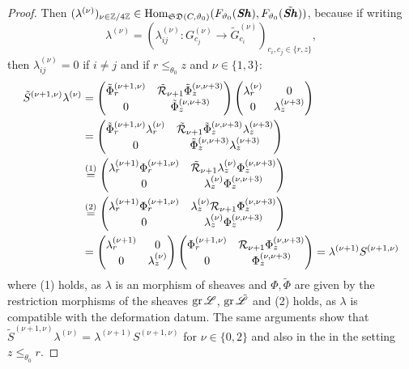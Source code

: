 \begin{proof}
    Then $(\lambda^{(\nu)})_{\nu \in \mathbb{Z}/4\mathbb{Z}} \in \operatorname{Hom}_{\mathfrak{SD}(C,\vartheta_0)}(F_{\vartheta_0}(\bm{\mathit{Sh}}),F_{\vartheta_0}(\tilde{\bm{\mathit{Sh}}}))$, because if writing \[\lambda^{(\nu)} = (\lambda_{ij}^{(\nu)}: G_{c_j}^{(\nu)} \to \tilde{G}_{c_i}^{(\nu)})_{c_i,c_j \in \{r,z\}},\] then $\lambda_{ij}^{(\nu)} = 0$ if $i\neq j$ and if $r \leq_{\theta_0} z$ and $\nu \in \{1,3\}$: 
        \begin{align*}
\tilde{S}^{(\nu+1,\nu)} \lambda^{(\nu)} & = 
        \begin{pmatrix}
            \tilde{\Phi}^{(\nu+1,\nu)}_r & \tilde{\mathcal{R}}_{\nu+1}\tilde{\Phi}_z^{(\nu,\nu+3)}\\
            0 & \tilde{\Phi}_z^{(\nu,\nu+3)}
        \end{pmatrix} 
        \begin{pmatrix}
            \lambda_r^{(\nu)} & 0\\
            0 & \lambda_z^{(\nu+3)}
        \end{pmatrix}
        \\ & =
        \begin{pmatrix}
            \tilde{\Phi}^{(\nu+1,\nu)}_r \lambda_r^{(\nu)} & \tilde{\mathcal{R}}_{\nu+1 }\tilde{\Phi}_z^{(\nu,\nu+3)} \lambda_z^{(\nu+3)}\\
            0 & \tilde{\Phi}_z^{(\nu,\nu+3)}\lambda_z^{(\nu+3)}
        \end{pmatrix} 
        \\ & \overset{(1)}{=} \begin{pmatrix}
            \lambda_r^{(\nu+1)}\Phi^{(\nu+1,\nu)}_r & \tilde{\mathcal{R}}_{\nu+1}\lambda_z^{(\nu)}\Phi_z^{(\nu,\nu+3)}\\
            0 & \lambda_z^{(\nu)}\Phi_z^{(\nu,\nu+3)}
        \end{pmatrix}
        \\ & \overset{(2)}{=}
        \begin{pmatrix}
            \lambda_r^{(\nu+1)} \Phi^{(\nu+1,\nu)}_r &  \lambda_z^{(\nu)}\mathcal{R}_{\nu+1}\Phi_z^{(\nu,\nu+3)}\\
            0 & \lambda_z^{(\nu)}\Phi_z^{(\nu,\nu+3)}
        \end{pmatrix} 
        \\ & = 
        \begin{pmatrix}
            \lambda_r^{(\nu+1)} & 0\\
            0 & \lambda_z^{(\nu)}
        \end{pmatrix} 
        \begin{pmatrix}
            \Phi^{(\nu+1,\nu)}_r & \mathcal{R}_{\nu+1}\Phi_z^{(\nu,\nu+3)}\\
            0 & \Phi_z^{(\nu,\nu+3)}
        \end{pmatrix} 
        = \lambda^{(\nu+1)}S^{(\nu+1,\nu)}
\end{align*}
where (1) holds, as $\lambda$ is an morphism of sheaves and $\Phi, \tilde{\Phi}$ are given by the restriction morphisms of the sheaves $\operatorname{gr}\mathscr{L}$, $\operatorname{gr}\tilde{\mathscr{L}}$ and (2) holds, as $\lambda$ is compatible with the deformation datum. The same arguments show that $\tilde{S}^{(\nu+1,\nu)} \lambda^{(\nu)}=\lambda^{(\nu+1)}S^{(\nu+1,\nu)}$ for $\nu \in \{0,2\}$ and also in the in the setting $z \leq_{\theta_0} r$.


\end{proof}
